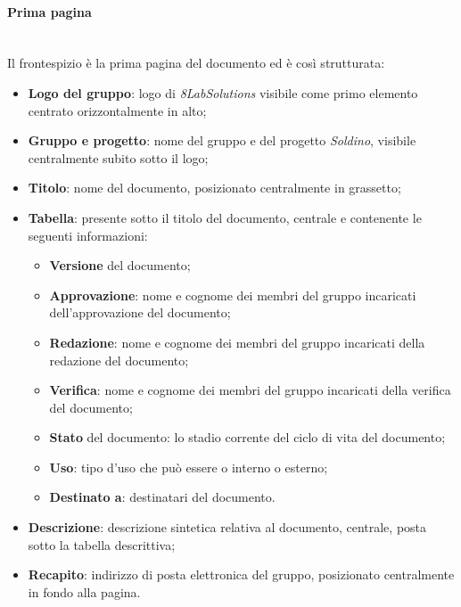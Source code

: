 		\paragraph{Prima pagina} \mbox{}\\
		Il frontespizio è la prima pagina del documento ed è così strutturata:
		\begin{itemize}
			\item \textbf{Logo del gruppo}: logo di \textit{8LabSolutions} visibile come primo elemento centrato orizzontalmente in alto;
			\item \textbf{Gruppo e progetto}: nome del gruppo e del progetto \textit{Soldino}, visibile centralmente subito sotto il logo;
			\item \textbf{Titolo}: nome del documento, posizionato centralmente in grassetto;
			\item \textbf{Tabella}: presente sotto il titolo del documento, centrale e contenente le seguenti informazioni:
			\begin{itemize}
				\item \textbf{Versione} del documento;
				\item \textbf{Approvazione}: nome e cognome dei membri del gruppo incaricati dell'approvazione del documento;
				\item \textbf{Redazione}: nome e cognome dei membri del gruppo incaricati della redazione del documento;
				\item \textbf{Verifica}: nome e cognome dei membri del gruppo incaricati della verifica del documento;
				\item \textbf{Stato} del documento: lo stadio corrente del ciclo di vita del documento;
				\item \textbf{Uso}: tipo d'uso che può essere o interno o esterno;
				\item \textbf{Destinato a}: destinatari del documento.
			\end{itemize}
			\item \textbf{Descrizione}: descrizione sintetica relativa al documento, centrale, posta sotto la tabella descrittiva;
			\item \textbf{Recapito}: indirizzo di posta elettronica del gruppo, posizionato centralmente in fondo alla pagina.
		\end{itemize}
